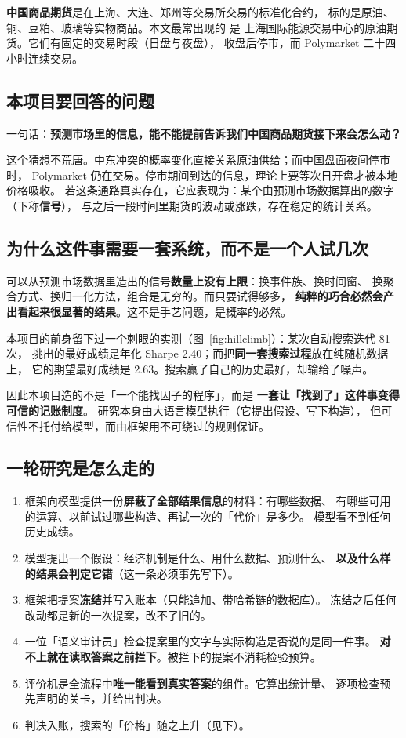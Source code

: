 \documentclass[11pt]{ctexart}
\begin{document}
\textbf{中国商品期货}是在上海、大连、郑州等交易所交易的标准化合约，
标的是原油、铜、豆粕、玻璃等实物商品。本文最常出现的  是
上海国际能源交易中心的原油期货。它们有固定的交易时段（日盘与夜盘），
收盘后停市，而 Polymarket 二十四小时连续交易。

\subsection{本项目要回答的问题}
一句话：\textbf{预测市场里的信息，能不能提前告诉我们中国商品期货接下来会怎么动？}

这个猜想不荒唐。中东冲突的概率变化直接关系原油供给；而中国盘面夜间停市时，
Polymarket 仍在交易。停市期间到达的信息，理论上要等次日开盘才被本地价格吸收。
若这条通路真实存在，它应表现为：某个由预测市场数据算出的数字（下称\textbf{信号}），
与之后一段时间里期货的波动或涨跌，存在稳定的统计关系。

\subsection{为什么这件事需要一套系统，而不是一个人试几次}
可以从预测市场数据里造出的信号\textbf{数量上没有上限}：换事件族、换时间窗、
换聚合方式、换归一化方法，组合是无穷的。而只要试得够多，
\textbf{纯粹的巧合必然会产出看起来很显著的结果}。这不是手艺问题，是概率的必然。

本项目的前身留下过一个刺眼的实测（图~\ref{fig:hillclimb}）：某次自动搜索迭代 81 次，
挑出的最好成绩是年化 Sharpe 2.40；而把\textbf{同一套搜索过程}放在纯随机数据上，
它的期望最好成绩是 2.63。搜索赢了自己的历史最好，却输给了噪声。

因此本项目造的不是「一个能找因子的程序」，而是
\textbf{一套让「找到了」这件事变得可信的记账制度}。
研究本身由大语言模型执行（它提出假设、写下构造），
但可信性不托付给模型，而由框架用不可绕过的规则保证。

\subsection{一轮研究是怎么走的}
\begin{enumerate}\itemsep2pt
\item 框架向模型提供一份\textbf{屏蔽了全部结果信息}的材料：有哪些数据、
  有哪些可用的运算、以前试过哪些构造、再试一次的「代价」是多少。
  模型看不到任何历史成绩。
\item 模型提出一个假设：经济机制是什么、用什么数据、预测什么、
  \textbf{以及什么样的结果会判定它错}（这一条必须事先写下）。
\item 框架把提案\textbf{冻结}并写入账本（只能追加、带哈希链的数据库）。
  冻结之后任何改动都是新的一次提案，改不了旧的。
\item 一位「语义审计员」检查提案里的文字与实际构造是否说的是同一件事。
  \textbf{对不上就在读取答案之前拦下}。被拦下的提案不消耗检验预算。
\item 评价机是全流程中\textbf{唯一能看到真实答案}的组件。它算出统计量、
  逐项检查预先声明的关卡，并给出判决。
\item 判决入账，搜索的「价格」随之上升（见下）。
\end{enumerate}
\end{document}
